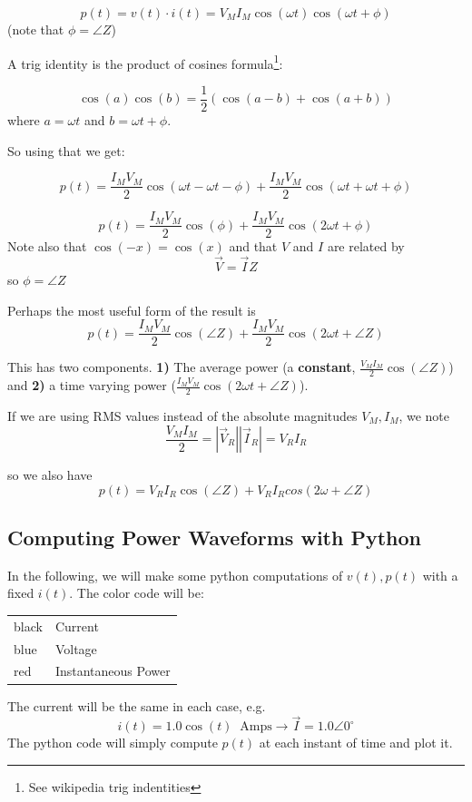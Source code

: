 \[
p(t) = v(t) \cdot i(t) = V_M I_M \cos(\omega t ) \cos(\omega t + \phi )
\]
(note that $\phi = \angle{Z}$)

\noindent A trig identity is the  product of cosines formula\footnote{See wikipedia trig indentities}:

\[
\cos(a) \cos(b) = \frac {1} {2} (\cos(a-b) + \cos(a+b))
\]
where $a=\omega t$ and $b=\omega t + \phi$.

So using that we get:

\[
p(t) = \frac{I_M V_M }{2} \cos(\omega t -\omega t - \phi) + \frac{I_M V_M}{2} \cos(\omega t + \omega t + \phi )
\]

\[
p(t) = \frac{I_M V_M }{2} \cos( \phi) + \frac{I_M V_M}{2} \cos(2\omega t + \phi )
\]
Note also that $\cos(-x) = \cos(x)$ and that $V$ and $I$ are related by
\[
\vec V = \vec I Z
\]
so $\phi = \angle {Z}$

Perhaps the  most useful form of the result is
\[
p(t) = \frac{I_M V_M }{2} \cos( \angle{Z}) + \frac{I_M V_M}{2} \cos(2\omega t + \angle{Z})
\]

This has two components.
{\bf 1)} The average power (a {\bf constant}, $\frac{V_M I_M}{2} \cos(\angle Z)$) and
{\bf 2)} a time varying power ($\frac{I_M V_M}{2} \cos(2\omega t   + \angle Z)$).

If we are using RMS values instead of the absolute magnitudes $V_M, I_M$,
we note
\[
\frac {V_MI_M}  {2} = |\vec V_R||\vec I_R| = V_R I_R
\]

so we also have
\[
p(t) = V_RI_R\cos(\angle{Z}) + V_RI_Rcos(2\omega+\angle{Z})
\]

\subsection{Computing Power Waveforms with Python}

\vspace{0.3in}
In the following, we will make some python computations of $v(t), p(t)$
with a fixed $i(t)$.   The color code will be:
\begin{center}
\begin{tabular}{l|l}\hline
black  &  Current \\
blue   &  Voltage \\
red    &  Instantaneous Power \\
\end{tabular}
\end{center}
The current will be the same in each case, e.g.
\[
i(t) = 1.0\cos(t) \;\; \text{Amps} \to  \vec I = 1.0 \angle 0^\circ
\]
The python code will simply compute $p(t)$ at each instant of time and plot it.

